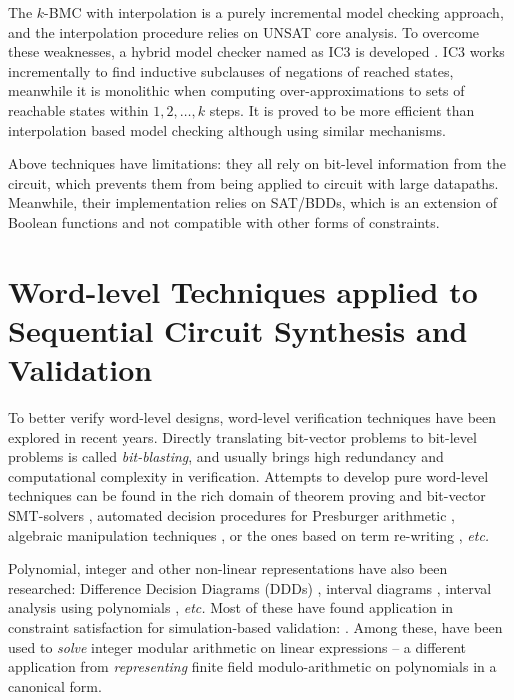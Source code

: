 The $k$-BMC with interpolation is a purely incremental model checking approach, and the interpolation procedure relies
on UNSAT core analysis. To overcome these weaknesses, a hybrid model checker named as IC3 is developed 
\cite{bradley2011sat,bradley2011incremental}. IC3 works incrementally to find inductive subclauses
of negations of reached states, meanwhile it is monolithic when computing over-approximations to sets of reachable
states within $1,2,\dots,k$ steps. It is proved to be more efficient than interpolation based model checking
although using similar mechanisms.

Above techniques have limitations: they all rely on bit-level information from 
the circuit, which prevents them from being applied to circuit with large datapaths.
Meanwhile, their implementation relies on SAT/BDDs, which is an extension of Boolean 
functions and not compatible with other forms of constraints.

\section{Word-level Techniques applied to Sequential Circuit Synthesis and Validation}
To better verify word-level designs, word-level verification techniques have been 
explored in recent years. Directly translating bit-vector problems to bit-level 
problems is called {\it bit-blasting}, and usually brings high redundancy and computational complexity in verification.
Attempts to develop pure word-level techniques can be found in
the rich domain of 
theorem proving \cite{arditi:bmd} and bit-vector SMT-solvers
\cite{boolector,cvc3,z3,bitvector98}, automated
decision procedures for Presburger arithmetic \cite{presburger,bultan:mixed_verification}, 
algebraic manipulation techniques 
\cite{devadas:algebraic_manipulation_iccd91}, or the ones based on
term re-writing \cite{AST}, {\it etc.}

Polynomial, integer and other non-linear representations have also
been researched: Difference Decision Diagrams (DDDs) \cite{ddd-csl99,ddd-mt-98}, interval
diagrams \cite{interval_dd}, interval analysis using polynomials
\cite{polynomial_sanchez99}, {\it etc.} Most of these have found 
application in constraint satisfaction for simulation-based
validation:  \cite{Ritter99,hsat,lpsat,brinkmann:asp-dac,Huang:tcad01,bitvector98}. Among
these, \cite{brinkmann:asp-dac,Huang:tcad01,bitvector98}
have been used to {\it solve} integer modular arithmetic on linear
expressions -- a different application from {\it representing}
finite field modulo-arithmetic on polynomials in a canonical form.   

